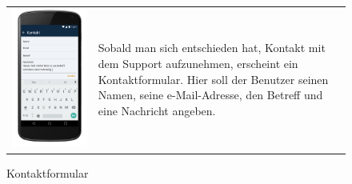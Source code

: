 \begin{figure}[h]
\begin{tabularx}{\textwidth}{X  X}
	\includegraphics[scale = 0.155]{img/AndroidMockup/contact} \caption{Kontaktformular} & Sobald man sich entschieden hat, Kontakt mit dem Support aufzunehmen, erscheint ein Kontaktformular. Hier soll der Benutzer seinen Namen, seine e-Mail-Adresse, den Betreff und eine Nachricht angeben. \\ 
\end{tabularx}
\end{figure} 

